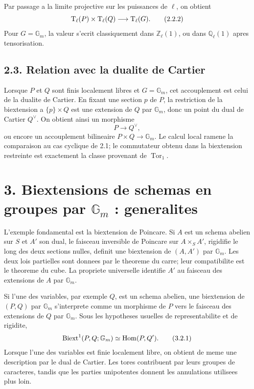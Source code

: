 \documentclass[11pt]{article}
\providecommand{\Tor}{\operatorname{Tor}}
\providecommand{\Ql}{\mathbb Q_\ell}
\providecommand{\Zl}{\mathbb Z_\ell}
\providecommand{\Gm}{\mathbb G_m}
\providecommand{\Hom}{\operatorname{Hom}}
\begin{document}
Par passage a la limite projective sur les puissances de \(\ell\), on obtient
\[
        \mathrm T_\ell(P)\times \mathrm T_\ell(Q)
        \longrightarrow \mathrm T_\ell(G).
\qquad\text{(2.2.2)}
\]
Pour \(G=\Gm\), la valeur s'ecrit classiquement dans \(\Zl(1)\), ou dans \(\Ql(1)\) apres tensorisation.

\subsection*{2.3. Relation avec la dualite de Cartier}

Lorsque \(P\) et \(Q\) sont finis localement libres et \(G=\Gm\), cet accouplement est celui de la dualite de Cartier.  En fixant une section \(p\) de \(P\), la restriction de la biextension a \(\{p\}\times Q\) est une extension de \(Q\) par \(\Gm\), donc un point du dual de Cartier \(Q^\vee\).  On obtient ainsi un morphisme
\[
        P\longrightarrow Q^\vee,
\]
ou encore un accouplement bilineaire \(P\times Q\to\Gm\).  Le calcul local ramene la comparaison au cas cyclique de 2.1; le commutateur obtenu dans la biextension restreinte est exactement la classe provenant de \(\Tor_1\).

\section*{3. Biextensions de schemas en groupes par \(\Gm\) : generalites}

L'exemple fondamental est la biextension de Poincare.  Si \(A\) est un schema abelien sur \(S\) et \(A'\) son dual, le faisceau inversible de Poincare sur \(A\times_S A'\), rigidifie le long des deux sections nulles, definit une biextension de \((A,A')\) par \(\Gm\).  Les deux lois partielles sont donnees par le theoreme du carre; leur compatibilite est le theoreme du cube.  La propriete universelle identifie \(A'\) au faisceau des extensions de \(A\) par \(\Gm\).

Si l'une des variables, par exemple \(Q\), est un schema abelien, une biextension de \((P,Q)\) par \(\Gm\) s'interprete comme un morphisme de \(P\) vers le faisceau des extensions de \(Q\) par \(\Gm\).  Sous les hypotheses usuelles de representabilite et de rigidite,
\[
        \Biext^1(P,Q;\Gm)\simeq \Hom(P,Q').
\qquad\text{(3.2.1)}
\]
Lorsque l'une des variables est finie localement libre, on obtient de meme une description par le dual de Cartier.  Les tores contribuent par leurs groupes de caracteres, tandis que les parties unipotentes donnent les annulations utilisees plus loin.
\end{document}

